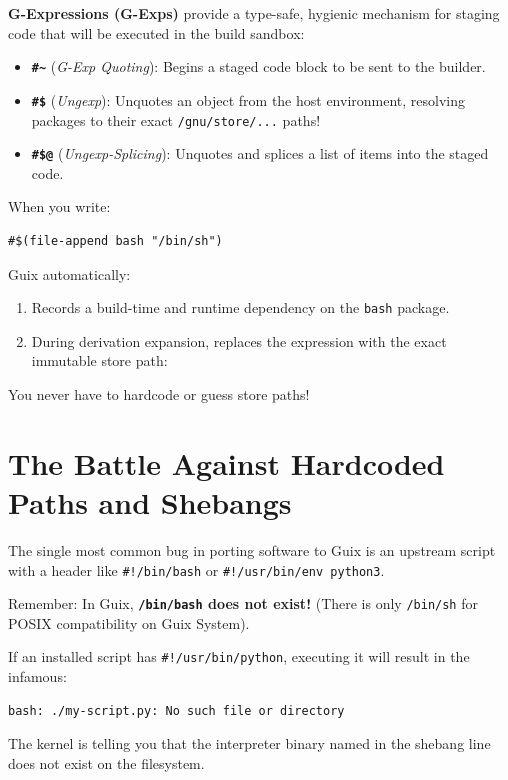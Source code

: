 \textbf{G-Expressions (G-Exps)} provide a type-safe, hygienic mechanism for staging code that will be executed in the build sandbox:

\begin{itemize}
  \item \textbf{\texttt{\#\~{}}} (\emph{G-Exp Quoting}): Begins a staged code block to be sent to the builder.
  \item \textbf{\texttt{\#\$}} (\emph{Ungexp}): Unquotes an object from the host environment, resolving packages to their exact \texttt{/gnu/store/...} paths!
  \item \textbf{\texttt{\#\$@}} (\emph{Ungexp-Splicing}): Unquotes and splices a list of items into the staged code.
\end{itemize}

\begin{alchemybox}
When you write:
\begin{lstlisting}[style=guixscheme]
#$(file-append bash "/bin/sh")
\end{lstlisting}
Guix automatically:
\begin{enumerate}
  \item Records a build-time and runtime dependency on the \texttt{bash} package.
  \item During derivation expansion, replaces the expression with the exact immutable store path:
  \begin{center}
  \end{center}
\end{enumerate}
You never have to hardcode or guess store paths!
\end{alchemybox}

\section{The Battle Against Hardcoded Paths and Shebangs}

The single most common bug in porting software to Guix is an upstream script with a header like \texttt{\#!/bin/bash} or \texttt{\#!/usr/bin/env python3}.

Remember: In Guix, \textbf{\texttt{/bin/bash} does not exist!} (There is only \texttt{/bin/sh} for POSIX compatibility on Guix System).

\begin{footgunbox}
If an installed script has \texttt{\#!/usr/bin/python}, executing it will result in the infamous:
\begin{lstlisting}[style=guixcli]
bash: ./my-script.py: No such file or directory
\end{lstlisting}
The kernel is telling you that the interpreter binary named in the shebang line does not exist on the filesystem.
\end{footgunbox}

